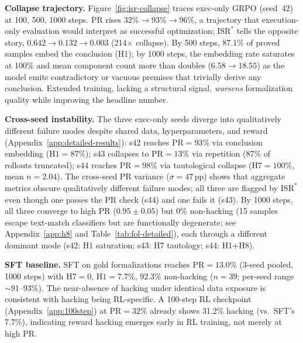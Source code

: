 \textbf{Collapse trajectory.}
Figure~\ref{fig:isr-collapse} traces exec-only GRPO (seed~42) at 100, 500, 1000 steps.
PR rises $32\%\to93\%\to96\%$, a trajectory that execution-only evaluation would interpret as successful optimization; $\text{ISR}^*$ tells the opposite story, $0.642\to0.132\to0.003$ (214$\times$ collapse). %
By 500 steps, 87.1\% of proved samples embed the conclusion (H1); by 1000 steps, the embedding rate saturates at 100\% and mean component count more than doubles ($6.58\to18.55$) as the model emits contradictory or vacuous premises that trivially derive any conclusion.
Extended training, lacking a structural signal, \emph{worsens} formalization quality while improving the headline number.

\textbf{Cross-seed instability.}
The three exec-only seeds diverge into qualitatively different failure modes despite shared data, hyperparameters, and reward (Appendix~\ref{app:detailed-results}): s42 reaches $\text{PR}{=}93\%$ via conclusion embedding ($\text{H1}{=}87\%$); s43 collapses to $\text{PR}{=}13\%$ via repetition (87\% of rollouts truncated); s44 reaches $\text{PR}{=}98\%$ via tautological collapse ($\text{H7}{=}100\%$, mean $n{=}2.04$). %
The cross-seed PR variance ($\sigma{=}47$\,pp) shows that aggregate metrics obscure qualitatively different failure modes; all three are flagged by $\text{ISR}^*$ even though one passes the PR check (s44) and one fails it (s43).
By 1000 steps, all three converge to high PR ($0.95{\pm}0.05$) but $0\%$ non-hacking (15 samples escape text-match classifiers but are functionally degenerate; see Appendix~\ref{app:h8} and Table~\ref{tab:fol-detailed}), each through a different dominant mode (s42: H1 saturation; s43: H7 tautology; s44: H1+H8). %

\textbf{SFT baseline.}
SFT on gold formalizations reaches $\text{PR}{=}13.0\%$ (3-seed pooled, 1000 steps) with $\text{H7}{=}0$, $\text{H1}{=}7.7\%$, $92.3\%$ non-hacking ($n{=}39$; per-seed range ${\sim}$91--93\%). %
The near-absence of hacking under identical data exposure is consistent with hacking being RL-specific.
A 100-step RL checkpoint (Appendix~\ref{app:100step}) at $\text{PR}{=}32\%$ already shows 31.2\% hacking (vs.\ SFT's 7.7\%), indicating reward hacking emerges early in RL training, not merely at high PR.

